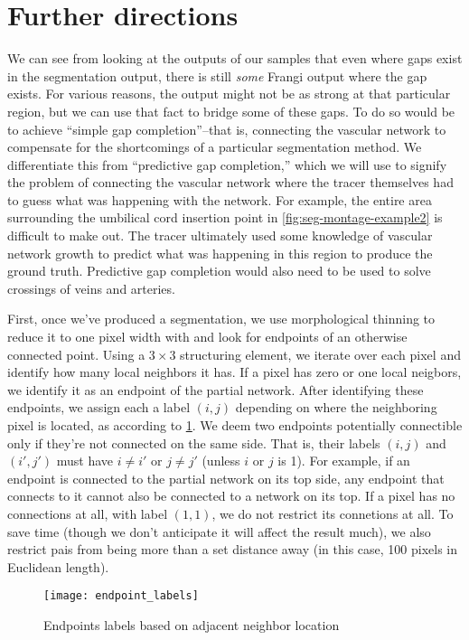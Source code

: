 \section{Further directions}
We can see from looking at the \Vmax outputs of our samples that even where gaps exist in the segmentation output, there is still \textit{some} Frangi output where the gap exists. For various reasons, the output might not be as strong at that particular region, but we can use that fact to bridge some of these gaps. To do so would be to achieve ``simple gap completion''--that is, connecting the vascular network to compensate for the shortcomings of a particular segmentation method. We differentiate this from ``predictive gap completion,'' which we will use to signify the problem of connecting the vascular network where the tracer themselves had to guess what was happening with the network. For example, the entire area surrounding the umbilical cord insertion point in \cref{fig:seg-montage-example2} is difficult to make out. The tracer ultimately used some knowledge of vascular network growth to predict what was happening in this region to produce the ground truth. Predictive gap completion would also need to be used to solve crossings of veins and arteries.

First, once we've produced a segmentation, we use morphological thinning to reduce it to one pixel width with \cite{thinning} and look for endpoints of an otherwise connected point. Using a $3\times 3$ structuring element, we iterate over each pixel and identify how many local neighbors it has. If a pixel has zero or one local neigbors, we identify it as an endpoint of the partial network. After identifying these endpoints, we assign each a label $(i,j)$ depending on where the neighboring pixel is located, as according to \cref{fig:endpoint_labels}. We deem two endpoints potentially connectible only if they're not connected on the same side. That is, their labels $(i,j)$ and $(i',j')$ must have $i\ne i'$ or $j\ne j'$ (unless $i$ or $j$ is 1). For example, if an endpoint is connected to the partial network on its top side, any endpoint that connects to it cannot also be connected to a network on its top. If a pixel has no connections at all, with label $(1,1)$, we do not restrict its connetions at all. To save time (though we don't anticipate it will affect the result much), we also restrict pais from being more than a set distance away (in this case, 100 pixels in Euclidean length).

\begin{figure}
	\centering
	\texttt{[image: endpoint\_labels]}
	\caption{Endpoints labels based on adjacent neighbor location}
	\label{fig:endpoint_labels}
\end{figure}

